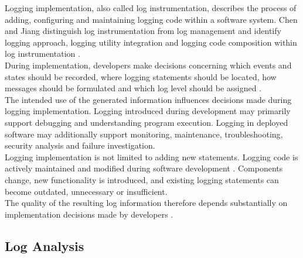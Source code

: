 Logging implementation, also called log instrumentation, describes the process of adding, configuring and maintaining logging code within a software system. 
Chen and Jiang distinguish log instrumentation from log management and identify logging approach, logging utility integration
and logging code composition within log instrumentation \cite{chen2021asurveyofsoftwareloginstrumentation}.
\\
During implementation, developers make decisions concerning which events and states should be recorded, where logging statements should be located,
how messages should be formulated and which log level should be assigned \cite{fu2014wheredodeveloperslog,zhu2015learningtolog}.
\\
The intended use of the generated information influences decisions made during logging implementation.
Logging introduced during development may primarily support debugging and understanding program execution. 
Logging in deployed software may additionally support monitoring, maintenance, troubleshooting, security analysis and failure investigation.
\\
Logging implementation is not limited to adding new statements. 
Logging code is actively maintained and modified during software development \cite{yuan2012characterzingloggingpractices,chen2017characterizingloggingpractices}.
Components change, new functionality is introduced, and existing logging statements can become outdated, unnecessary or insufficient.
\\
The quality of the resulting log information therefore depends substantially on implementation decisions made by developers \cite{chen2021asurveyofsoftwareloginstrumentation}.

\subsection{Log Analysis}
\label{subsec:log_analysis}

